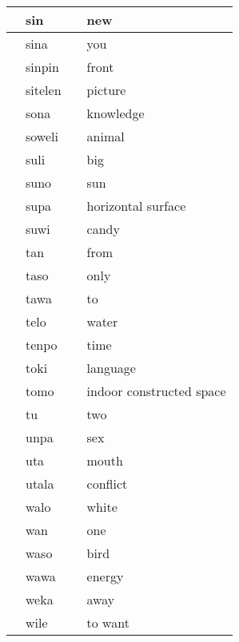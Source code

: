 \begin{table}
\begin{tabular}{|l|l|l|l|}
         & sin &  & new \\ \hline
         & sina &  & you \\ \hline
         & sinpin &  & front \\ \hline
        ️ & sitelen &  & picture \\ \hline
         & sona &  & knowledge \\ \hline
         & soweli &  & animal \\ \hline
        ️ & suli &  & big \\ \hline
         & suno &  & sun \\ \hline
         & supa &  & horizontal surface \\ \hline
         & suwi &  & candy \\ \hline
         & tan &  & from \\ \hline
         & taso &  & only \\ \hline
         & tawa &  & to \\ \hline
         & telo &  & water \\ \hline
        ️ & tenpo &  & time \\ \hline
         & toki &  & language \\ \hline
         & tomo &  & indoor constructed space \\ \hline
         & tu &  & two \\ \hline
         & unpa &  & sex \\ \hline
         & uta &  & mouth \\ \hline
         & utala &  & conflict \\ \hline
         & walo &  & white \\ \hline
         & wan &  & one \\ \hline
         & waso &  & bird \\ \hline
        ️ & wawa &  & energy \\ \hline
         & weka &  & away \\ \hline
         & wile &  & to want \\ \hline
    \end{tabular}
\end{table}